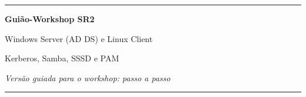 
\begin{titlepage}
  \centering
  \vspace*{\fill}
  {\color{azul}\rule{\linewidth}{1.2pt}\par}
  \vspace{1.5em}
  {\Huge\bfseries\color{azul} Guião-Workshop SR2\par}
  \vspace{1.2em}
  {\LARGE Windows Server (AD DS) e Linux Client\par}
  \vspace{0.5em}
  {\Large Kerberos, Samba, SSSD e PAM\par}
  \vspace{1.0em}
  {\large\itshape Versão guiada para o workshop: passo a passo\par}
  \vspace{1.5em}
  {\color{azul}\rule{\linewidth}{1.2pt}\par}
  \vspace*{\fill}
\end{titlepage}

\pagestyle{plain}
\tableofcontents
\clearpage
{}
\pagestyle{fancy}
